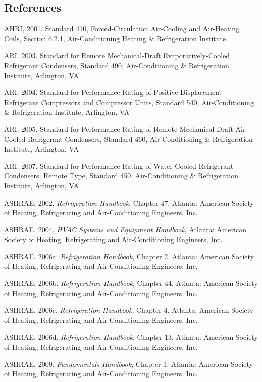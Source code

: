 \subsection{References}\label{references-040}

AHRI, 2001. Standard 410, Forced-Circulation Air-Cooling and Air-Heating Coils, Section 6.2.1, Air-Conditioning Heating \& Refrigeration Institute

ARI. 2003. Standard for Remote Mechanical-Draft Evaporatively-Cooled Refrigerant Condensers, Standard 490, Air-Conditioning \& Refrigeration Institute, Arlington, VA

ARI. 2004. Standard for Performance Rating of Positive Displacement Refrigerant Compressors and Compressor Units, Standard 540, Air-Conditioning \& Refrigeration Institute, Arlington, VA

ARI. 2005. Standard for Performance Rating of Remote Mechanical-Draft Air-Cooled Refrigerant Condensers, Standard 460, Air-Conditioning \& Refrigeration Institute, Arlington, VA

ARI. 2007. Standard for Performance Rating of Water-Cooled Refrigerant Condensers, Remote Type, Standard 450, Air-Conditioning \& Refrigeration Institute, Arlington, VA

ASHRAE. 2002. \emph{Refrigeration Handbook}, Chapter 47. Atlanta: American Society of Heating, Refrigerating and Air-Conditioning Engineers, Inc.

ASHRAE. 2004. \emph{HVAC Systems and Equipment Handbook}, Atlanta: American Society of Heating, Refrigerating and Air-Conditioning Engineers, Inc.

ASHRAE. 2006a. \emph{Refrigeration Handbook}, Chapter 2. Atlanta: American Society of Heating, Refrigerating and Air-Conditioning Engineers, Inc.

ASHRAE. 2006b. \emph{Refrigeration Handbook}, Chapter 44. Atlanta: American Society of Heating, Refrigerating and Air-Conditioning Engineers, Inc.

ASHRAE. 2006c. \emph{Refrigeration Handbook}, Chapter 4. Atlanta: American Society of Heating, Refrigerating and Air-Conditioning Engineers, Inc.

ASHRAE. 2006d. \emph{Refrigeration Handbook}, Chapter 13. Atlanta: American Society of Heating, Refrigerating and Air-Conditioning Engineers, Inc.

ASHRAE. 2009. \emph{Fundamentals Handbook}, Chapter 1. Atlanta: American Society of Heating, Refrigerating and Air-Conditioning Engineers, Inc.

